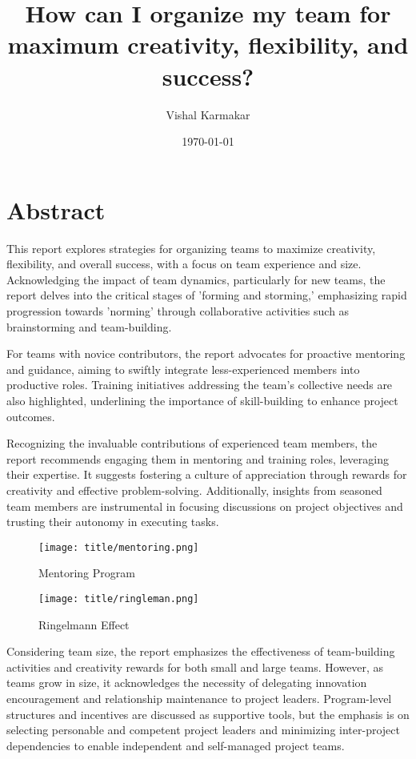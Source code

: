 \documentclass[a4paper, twoside]{article}
\date{\monthyeardate\today}
\author{Vishal  Karmakar}
\title{How can I organize my team
for maximum creativity, flexibility,
and success?}
\begin{document}


\section{Abstract}
This report explores strategies for organizing teams to maximize creativity, flexibility, and overall success, with a focus on team experience and size. Acknowledging the impact of team dynamics, particularly for new teams, the report delves into the critical stages of 'forming and storming,' emphasizing rapid progression towards 'norming' through collaborative activities such as brainstorming and team-building.

For teams with novice contributors, the report advocates for proactive mentoring and guidance, aiming to swiftly integrate less-experienced members into productive roles. Training initiatives addressing the team's collective needs are also highlighted, underlining the importance of skill-building to enhance project outcomes.

Recognizing the invaluable contributions of experienced team members, the report recommends engaging them in mentoring and training roles, leveraging their expertise. It suggests fostering a culture of appreciation through rewards for creativity and effective problem-solving. Additionally, insights from seasoned team members are instrumental in focusing discussions on project objectives and trusting their autonomy in executing tasks.



\begin{figure}[h]
\centering
\begin{minipage}{.5\textwidth}
  \centering
  \texttt{[image: title/mentoring.png]}
  \caption{Mentoring Program}
  \label{fig:test1}
\end{minipage}%
\begin{minipage}{.5\textwidth}
  \centering
  \texttt{[image: title/ringleman.png]}
  \caption{Ringelmann Effect}
  \label{fig:test2}
\end{minipage}
\end{figure}

Considering team size, the report emphasizes the effectiveness of team-building activities and creativity rewards for both small and large teams. However, as teams grow in size, it acknowledges the necessity of delegating innovation encouragement and relationship maintenance to project leaders. Program-level structures and incentives are discussed as supportive tools, but the emphasis is on selecting personable and competent project leaders and minimizing inter-project dependencies to enable independent and self-managed project teams.
\end{document}
